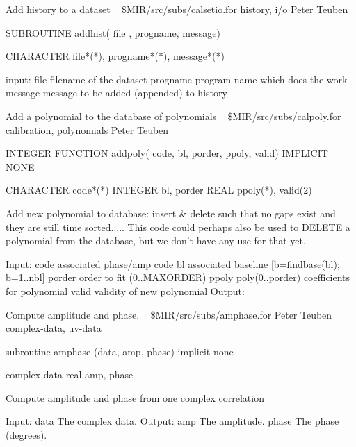 %
\noindent Add history to a dataset
\newline \ 
\newline {} \$MIR/src/subs/calsetio.for
\newline {} history, i/o
\newline {} Peter Teuben
\par{\tenpoint
{\eightpoint\begintt
        SUBROUTINE addhist( file , progname, message)

        CHARACTER  file*(*), progname*(*), message*(*)

       input:
           file        filename of the dataset
           progname    program name which does the work
           message     message to be added (appended) to history
\endtt}
\par}
%
\noindent Add a polynomial to the database of polynomials
\newline \ 
\newline {} \$MIR/src/subs/calpoly.for
\newline {} calibration, polynomials
\newline \abox{Responsible:} Peter Teuben
\par{\tenpoint
{\eightpoint\begintt
        INTEGER FUNCTION addpoly( code, bl, porder, ppoly, valid)
        IMPLICIT NONE

        CHARACTER code*(*)
        INTEGER   bl, porder
        REAL      ppoly(*), valid(2)

   Add new polynomial to database: insert & delete such that no
   gaps exist and they are still time sorted.....
   This code could perhaps also be used to DELETE a polynomial 
   from the database, but we don't have any use for that yet.

   Input:
       code      associated phase/amp code
       bl        associated baseline [b=findbase(bl); b=1..nbl]
       porder    order to fit (0..MAXORDER)
       ppoly     poly(0..porder) coefficients for polynomial
       valid     validity of new polynomial
   Output:
\endtt}
\par}
%
\noindent Compute amplitude and phase.
\newline \ 
\newline {} \$MIR/src/subs/amphase.for
\newline \abox{Responsible:} Peter Teuben
\newline {} complex-data, uv-data
\par{\tenpoint
{\eightpoint\begintt
      subroutine amphase (data, amp, phase)
      implicit none

      complex data
      real amp, phase

  Compute amplitude and phase from one complex correlation

  Input:
    data       The complex data.
  Output:
    amp        The amplitude.
    phase      The phase (degrees).
\endtt}
\par}
